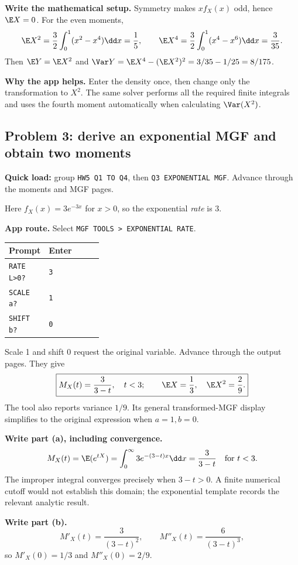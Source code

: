 \textbf{Write the mathematical setup.} Symmetry makes $xf_X(x)$ odd, hence $\E X=0$. For the even moments,
\[
\E X^2=\frac32\int_0^1(x^2-x^4)\dd x=\frac15,\qquad
\E X^4=\frac32\int_0^1(x^4-x^6)\dd x=\frac3{35}.
\]
Then $\E Y=\E X^2$ and $\Var Y=\E X^4-(\E X^2)^2=3/35-1/25=8/175$.

\textbf{Why the app helps.} Enter the density once, then change only the transformation to $X^2$. The same solver performs all the required finite integrals and uses the fourth moment automatically when calculating $\Var(X^2)$.

\subsection{Problem 3: derive an exponential MGF and obtain two moments}
\textbf{Quick load:} group \texttt{HW5 Q1 TO Q4}, then \texttt{Q3 EXPONENTIAL MGF}. Advance through the moments and MGF pages.

Here $f_X(x)=3e^{-3x}$ for $x>0$, so the exponential \emph{rate} is 3.

\textbf{App route.} Select \texttt{MGF TOOLS > EXPONENTIAL RATE}.
\begin{center}
\begin{tabularx}{\linewidth}{@{}p{0.32\linewidth}X@{}}
\toprule Prompt & Enter\\\midrule
\texttt{RATE L>0?} & \texttt{3}\\
\texttt{SCALE a?} & \texttt{1}\\
\texttt{SHIFT b?} & \texttt{0}\\\bottomrule
\end{tabularx}
\end{center}
Scale 1 and shift 0 request the original variable. Advance through the output pages. They give
\[
\boxed{M_X(t)=\frac3{3-t},\quad t<3;\qquad \E X=\frac13,\quad \E X^2=\frac29.}
\]
The tool also reports variance $1/9$. Its general transformed-MGF display simplifies to the original expression when $a=1,b=0$.

\textbf{Write part (a), including convergence.}
\[
M_X(t)=\E(e^{tX})=\int_0^\infty 3e^{-(3-t)x}\dd x
=\frac3{3-t}\quad\text{for }t<3.
\]
The improper integral converges precisely when $3-t>0$. A finite numerical cutoff would not establish this domain; the exponential template records the relevant analytic result.

\textbf{Write part (b).}
\[
M'_X(t)=\frac3{(3-t)^2},\qquad M''_X(t)=\frac6{(3-t)^3},
\]
so $M'_X(0)=1/3$ and $M''_X(0)=2/9$.

